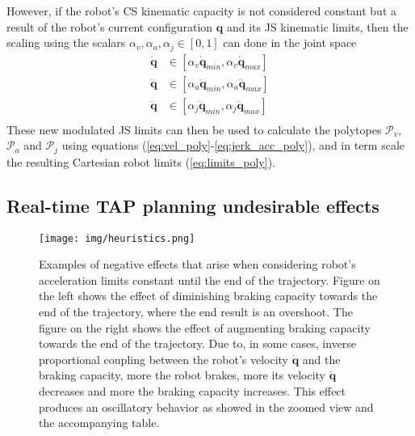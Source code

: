However, if the robot's CS kinematic capacity is not considered constant but a result of the robot's current configuration $\bm{q}$ and its JS kinematic limits, then the scaling using the scalars $\alpha_v,\alpha_a,\alpha_j\in[0,1]$ can done in the joint space
\begin{equation}
\begin{split}
\dot{\bm{q}}&\in  [\alpha_v\dot{\bm{q}}_{min},\alpha_v\dot{\bm{q}}_{max}] \\
\ddot{\bm{q}}&\in  [\alpha_a\ddot{\bm{q}}_{min},\alpha_a\ddot{\bm{q}}_{max}] \\
\dddot{\bm{q}}&\in  [\alpha_j\dddot{\bm{q}}_{min},\alpha_j\dddot{\bm{q}}_{max}] \\
 \end{split} \label{eq:limits_cs_alpha}
\end{equation}
These new modulated JS limits can then be used to calculate the polytopes $\mathcal{P}_v$,$\mathcal{P}_a$ and $\mathcal{P}_j$ using equations (\ref{eq:vel_poly}-\ref{eq:jerk_acc_poly}), and in term scale the resulting Cartesian robot limits (\ref{eq:limits_poly}).


\subsection{Real-time TAP planning undesirable effects}
\label{ch:heuristics}

\begin{figure}[tb!]
    \centering
    \texttt{[image: img/heuristics.png]}
    \caption{Examples of negative effects that arise when considering robot's acceleration limits constant until the end of the trajectory. Figure on the left shows the effect of diminishing braking capacity towards the end of the trajectory, where the end result is an overshoot. The figure on the right shows the effect of augmenting braking capacity towards the end of the trajectory. Due to, in some cases, inverse proportional coupling between the robot's velocity $\dot{\bm{q}}$ and the braking capacity, more the robot brakes, more its velocity $\dot{\bm{q}}$ decreases and more the braking capacity increases. This effect produces an oscillatory behavior as showed in the zoomed view and the accompanying table. }
    \label{fig:overshoot_shema}
\end{figure}

